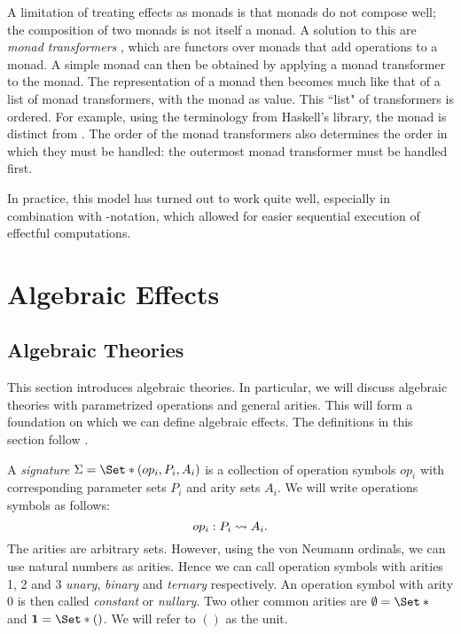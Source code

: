 A limitation of treating effects as monads is that monads do not compose well; the composition of two monads is not itself a monad. A solution to this are \emph{monad transformers} \autocite{moggi_abstract_1989}, which are functors over monads that add operations to a monad. A simple monad can then be obtained by applying a monad transformer to the  monad. The representation of a monad then becomes much like that of a list of monad transformers, with the  monad as  value. This ``list" of transformers is ordered. For example, using the terminology from Haskell's  library, the monad  is distinct from . The order of the monad transformers also determines the order in which they must be handled: the outermost monad transformer must be handled first.

In practice, this model has turned out to work quite well, especially in combination with -notation, which allowed for easier sequential execution of effectful computations.

\section{Algebraic Effects}\label{sec:alg}


\subsection{Algebraic Theories}

This section introduces algebraic theories. In particular, we will discuss algebraic theories with parametrized operations and general arities. This will form a foundation on which we can define algebraic effects. The definitions in this section follow \textcite{bauer_what_2018}.


\begin{definition}[Signature]
    A \emph{signature} $\Sig = \S{(op_i, P_i, A_i)}$ is a collection of operation symbols $op_i$ with corresponding parameter sets $P_i$ and arity sets $A_i$. We will write operations symbols as follows:
    \[ op_i : P_i \rightsquigarrow A_i. \]
    The arities are arbitrary sets. However, using the von Neumann ordinals, we can use natural numbers as arities. Hence we can call operation symbols with arities 1, 2 and 3 \emph{unary}, \emph{binary} and \emph{ternary} respectively. An operation symbol with arity $0$ is then called \emph{constant} or \emph{nullary}. Two other common arities are $\emptyset = \S{}$ and $\mathbf{1} = \S{()}$. We will refer to $()$ as the unit.
\end{definition}

